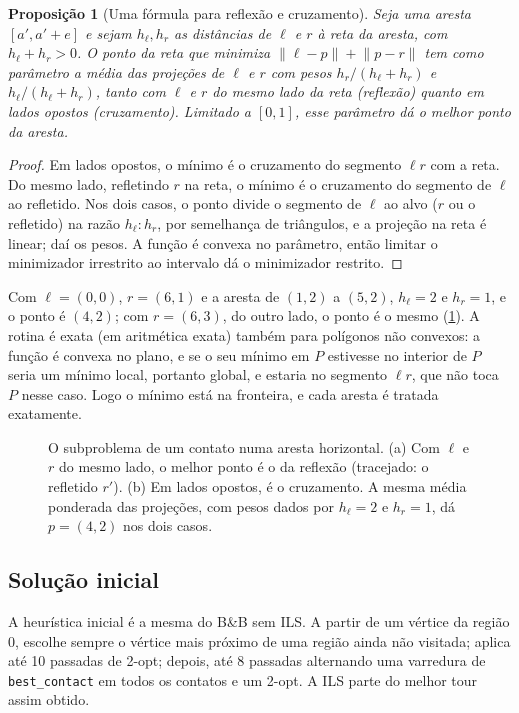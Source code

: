\documentclass[11pt,a4paper]{article}
\theoremstyle{plain}\newtheorem{proposicao}{Proposição}
\theoremstyle{definition}\newtheorem{definicao}{Definição}
\theoremstyle{plain}\newtheorem{teorema}{Teorema}
\theoremstyle{plain}\newtheorem{lema}{Lema}
\newcommand{\norm}[1]{\lVert#1\rVert}
\newcommand{\code}[1]{\texttt{\small #1}}
\begin{document}
\begin{proposicao}[Uma fórmula para reflexão e cruzamento]\label{prop:melhorcontato}
Seja uma aresta \([a',a'+e]\) e sejam \(h_\ell,h_r\) as distâncias de \(\ell\) e \(r\) à reta da aresta, com \(h_\ell+h_r>0\). O ponto da reta que minimiza \(\norm{\ell-p}+\norm{p-r}\) tem como parâmetro a média das projeções de \(\ell\) e \(r\) com pesos \(h_r/(h_\ell+h_r)\) e \(h_\ell/(h_\ell+h_r)\), tanto com \(\ell\) e \(r\) do mesmo lado da reta (reflexão) quanto em lados opostos (cruzamento). Limitado a \([0,1]\), esse parâmetro dá o melhor ponto da aresta.
\end{proposicao}
\begin{proof}
Em lados opostos, o mínimo é o cruzamento do segmento \(\ell r\) com a reta. Do mesmo lado, refletindo \(r\) na reta, o mínimo é o cruzamento do segmento de \(\ell\) ao refletido. Nos dois casos, o ponto divide o segmento de \(\ell\) ao alvo (\(r\) ou o refletido) na razão \(h_\ell:h_r\), por semelhança de triângulos, e a projeção na reta é linear; daí os pesos. A função é convexa no parâmetro, então limitar o minimizador irrestrito ao intervalo dá o minimizador restrito.
\end{proof}
Com \(\ell=(0,0)\), \(r=(6,1)\) e a aresta de \((1,2)\) a \((5,2)\), \(h_\ell=2\) e \(h_r=1\), e o ponto é \((4,2)\); com \(r=(6,3)\), do outro lado, o ponto é o mesmo (\cref{fig:melhorcontato}). A rotina é exata (em aritmética exata) também para polígonos não convexos: a função é convexa no plano, e se o seu mínimo em \(P\) estivesse no interior de \(P\) seria um mínimo local, portanto global, e estaria no segmento \(\ell r\), que não toca \(P\) nesse caso. Logo o mínimo está na fronteira, e cada aresta é tratada exatamente.

\begin{figure}[ht]\centering\figmelhorcontato
\caption{O subproblema de um contato numa aresta horizontal. (a) Com \(\ell\) e \(r\) do mesmo lado, o melhor ponto é o da reflexão (tracejado: o refletido \(r'\)). (b) Em lados opostos, é o cruzamento. A mesma média ponderada das projeções, com pesos dados por \(h_\ell=2\) e \(h_r=1\), dá \(p=(4,2)\) nos dois casos.}\label{fig:melhorcontato}
\end{figure}

\subsection{Solução inicial}
A heurística inicial é a mesma do B\&B sem ILS. A partir de um vértice da região 0, escolhe sempre o vértice mais próximo de uma região ainda não visitada; aplica até 10 passadas de 2-opt; depois, até 8 passadas alternando uma varredura de \code{best\_contact} em todos os contatos e um 2-opt. A ILS parte do melhor tour assim obtido.
\end{document}
